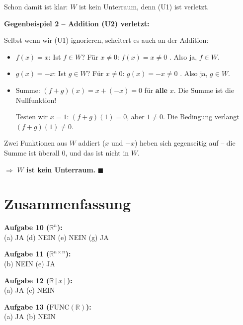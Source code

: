 \documentclass[a4paper,12pt]{article}
\begin{document}
\begin{merkbox}
Schon damit ist klar: $W$ ist kein Unterraum, denn (U1) ist verletzt.
\end{merkbox}

\textbf{Gegenbeispiel 2 -- Addition (U2) verletzt:}

Selbst wenn wir (U1) ignorieren, scheitert es auch an der Addition:

\begin{itemize}
\item $f(x) = x$: Ist $f \in W$?
    F\"ur $x \neq 0$: $f(x) = x \neq 0$ \checkmark.
    Also ja, $f \in W$.

\item $g(x) = -x$: Ist $g \in W$?
    F\"ur $x \neq 0$: $g(x) = -x \neq 0$ \checkmark.
    Also ja, $g \in W$.

\item Summe: $(f+g)(x) = x + (-x) = 0$ f\"ur \textbf{alle} $x$.
    Die Summe ist die Nullfunktion!

    Testen wir $x = 1$: $(f+g)(1) = 0$, aber $1 \neq 0$.
    Die Bedingung verlangt $(f+g)(1) \neq 0$. \Lightning
\end{itemize}

Zwei Funktionen aus $W$ addiert ($x$ und $-x$) heben sich gegenseitig auf -- die Summe ist \"uberall $0$, und das ist nicht in $W$.

$\Rightarrow$ \textbf{$W$ ist kein Unterraum.} \hfill $\blacksquare$

\newpage

\part*{Zusammenfassung}

\begin{merkbox}[title={\"Ubersicht aller Ergebnisse}]
\textbf{Aufgabe 10 ($\mathbb{R}^n$):}\\
(a) JA \quad (d) NEIN \quad (e) NEIN \quad (g) JA

\medskip
\textbf{Aufgabe 11 ($\mathbb{R}^{n \times n}$):}\\
(b) NEIN \quad (e) JA

\medskip
\textbf{Aufgabe 12 ($\mathbb{R}[x]$):}\\
(a) JA \quad (c) NEIN

\medskip
\textbf{Aufgabe 13 ($\mathrm{FUNC}(\mathbb{R})$):}\\
(a) JA \quad (b) NEIN
\end{merkbox}
\end{document}
